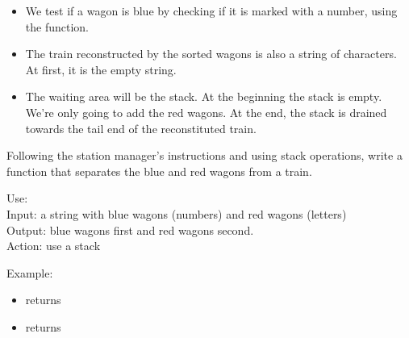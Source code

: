 \documentclass[11pt,class=report,crop=false]{standalone}
\begin{document}
\begin{activite}
\begin{itemize}
  \item We test if a wagon is blue by checking if it is marked with a number, using the  function.
  
  \item The train reconstructed by the sorted wagons is also a string of characters. At first, it is the empty string.
  
  \item The waiting area will be the stack. At the beginning the stack is empty. We're only going to add the red wagons. At the end, the stack is drained towards the tail end of the reconstituted train.
\end{itemize}


Following the station manager's instructions and using stack operations, write a  function that separates the blue and red wagons from a train.


\begin{fonction}
  Use:  \\
  Input: a string with blue wagons (numbers) and red wagons (letters) \\
  Output: blue wagons first and red wagons second.\\
  Action: use a stack
  
  \medskip
    
  Example: 
  \begin{itemize}
    \item {} returns 
    \item {} returns 
    \end{itemize}
    
\end{fonction}

\end{activite}

\end{document}
